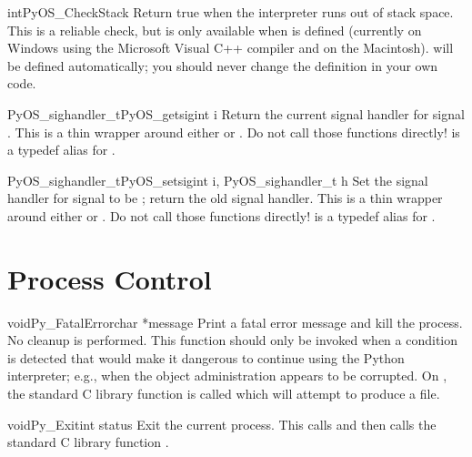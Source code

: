 \documentclass{manual}
\begin{document}
\begin{cfuncdesc}{int}{PyOS_CheckStack}{}
Return true when the interpreter runs out of stack space.  This is a
reliable check, but is only available when  is
defined (currently on Windows using the Microsoft Visual C++ compiler
and on the Macintosh).   will be defined
automatically; you should never change the definition in your own
code.
\end{cfuncdesc}

\begin{cfuncdesc}{PyOS_sighandler_t}{PyOS_getsig}{int i}
Return the current signal handler for signal .
This is a thin wrapper around either  or
.  Do not call those functions directly!
 is a typedef alias for .
\end{cfuncdesc}

\begin{cfuncdesc}{PyOS_sighandler_t}{PyOS_setsig}{int i, PyOS_sighandler_t h}
Set the signal handler for signal  to be ;
return the old signal handler.
This is a thin wrapper around either  or
.  Do not call those functions directly!
 is a typedef alias for .
\end{cfuncdesc}


\section{Process Control \label{processControl}}

\begin{cfuncdesc}{void}{Py_FatalError}{char *message}
Print a fatal error message and kill the process.  No cleanup is
performed.  This function should only be invoked when a condition is
detected that would make it dangerous to continue using the Python
interpreter; e.g., when the object administration appears to be
corrupted.  On \UNIX{}, the standard C library function
 is called which will attempt to
produce a  file.
\end{cfuncdesc}

\begin{cfuncdesc}{void}{Py_Exit}{int status}
Exit the current process.  This calls
 and
then calls the standard C library function
.
\end{cfuncdesc}
\end{document}
